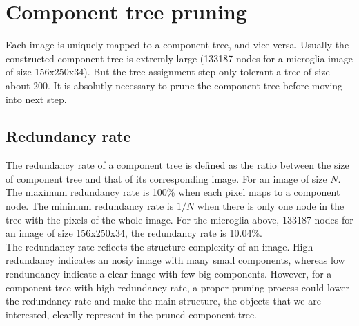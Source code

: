 \section{Component tree pruning}
Each image is uniquely mapped to a component tree, and vice versa. Usually the constructed component tree is extremly large (133187 nodes for a microglia image of size 156x250x34). But the tree assignment step only tolerant a tree of size about 200. It is absolutly necessary to prune the component tree before moving into next step.\\
\subsection{Redundancy rate}
The redundancy rate of a component tree is defined as the ratio between the size of component tree and that of its corresponding image. For an image of size $N$. The maximum redundancy rate is 100\% when each pixel maps to a component node. The minimum redundancy rate is $1/N$ when there is only one node in the tree with the pixels of the whole image. For the microglia above, 133187 nodes for an image of size 156x250x34, the redundancy rate is 10.04\%.\\
The redundancy rate reflects the structure complexity of an image. High redundancy indicates an nosiy image with many small components, whereas low rendundancy indicate a clear image with few big components. However, for a component tree with high redundancy rate, a proper pruning process could lower the redundancy rate and make the main structure, the objects that we are interested, clearlly represent in the pruned component tree.
